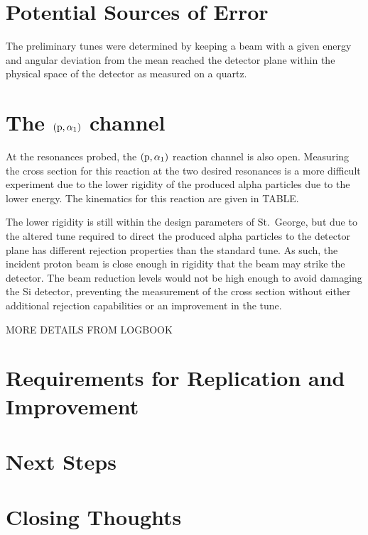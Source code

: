 \section{Potential Sources of Error}
\label{sec:potential-sources-of-error}

The preliminary tunes were determined by keeping a beam with a given
energy and angular deviation from the mean reached the detector plane
within the physical space of the detector as measured on a quartz.


\section{The $(\rm{p},\alpha_1)$ channel}
\label{sec:the-palpha_1-channel}

At the resonances probed, the $(\rm{p},\alpha_1)$ reaction channel is also
open. Measuring the cross section for this reaction at the two desired
resonances is a more difficult experiment due to the lower rigidity of
the produced alpha particles due to the lower energy. The kinematics for
this reaction are given in TABLE.

The lower rigidity is still within the design parameters of St.\ George,
but due to the altered tune required to direct the produced alpha
particles to the detector plane has different rejection properties than
the standard tune. As such, the incident proton beam is close enough in
rigidity that the beam may strike the detector. The beam reduction
levels would not be high enough to avoid damaging the Si detector,
preventing the measurement of the cross section without either
additional rejection capabilities or an improvement in the tune.

MORE DETAILS FROM LOGBOOK


\section{Requirements for Replication and Improvement}
\label{sec:requirements-for-replication-and-improvement}


\section{Next Steps}
\label{sec:next-steps}


\section{Closing Thoughts}
\label{sec:closing-thoughts}
